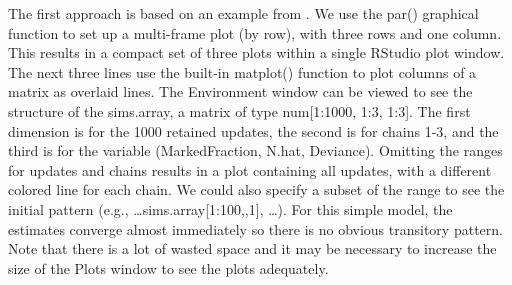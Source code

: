\documentclass[
]{krantz}
\makeatletter
\newenvironment{Shaded}{\begin{snugshade}}{\end{snugshade}}
\newcommand{\AttributeTok}[1]{\textcolor[rgb]{0.27,0.27,0.27}{#1}}
\newcommand{\CommentTok}[1]{\textcolor[rgb]{0.37,0.37,0.37}{\textit{#1}}}
\newcommand{\DecValTok}[1]{\textcolor[rgb]{0.06,0.06,0.06}{#1}}
\newcommand{\FunctionTok}[1]{\textcolor[rgb]{0.27,0.27,0.27}{\textbf{#1}}}
\newcommand{\NormalTok}[1]{#1}
\newcommand{\OtherTok}[1]{\textcolor[rgb]{0.37,0.37,0.37}{#1}}
\newcommand{\SpecialCharTok}[1]{\textcolor[rgb]{0.43,0.43,0.43}{\textbf{#1}}}
\newcommand{\StringTok}[1]{\textcolor[rgb]{0.5,0.5,0.5}{#1}}
\newenvironment{kframe}{%
\medskip{}
\setlength{\fboxsep}{.8em}
 \def\at@end@of@kframe{}%
 \ifinner\ifhmode%
  \def\at@end@of@kframe{\end{minipage}}%
  \begin{minipage}{\columnwidth}%
 \fi\fi%
 \def\FrameCommand##1{\hskip\@totalleftmargin \hskip-\fboxsep
 \colorbox{shadecolor}{##1}\hskip-\fboxsep
     \hskip-\linewidth \hskip-\@totalleftmargin \hskip\columnwidth}%
 \MakeFramed {\advance\hsize-\width
   \@totalleftmargin\z@ \linewidth\hsize
   \@setminipage}}%
 {\par\unskip\endMakeFramed%
 \at@end@of@kframe}
\renewenvironment{Shaded}{\begin{kframe}}{\end{kframe}}
\makeatother
\begin{document}
\begin{Shaded}
\end{Shaded}

The first approach is based on an example from \citet{kéry_2010}. We use the par() graphical function to set up a multi-frame plot (by row), with three rows and one column. This results in a compact set of three plots within a single RStudio plot window. The next three lines use the built-in matplot() function to plot columns of a matrix as overlaid lines. The Environment window can be viewed to see the structure of the sims.array, a matrix of type num{[}1:1000, 1:3, 1:3{]}. The first dimension is for the 1000 retained updates, the second is for chains 1-3, and the third is for the variable (MarkedFraction, N.hat, Deviance). Omitting the ranges for updates and chains results in a plot containing all updates, with a different colored line for each chain. We could also specify a subset of the range to see the initial pattern (e.g., \ldots sims.array{[}1:100,,1{]}, \ldots). For this simple model, the estimates converge almost immediately so there is no obvious transitory pattern. Note that there is a lot of wasted space and it may be necessary to increase the size of the Plots window to see the plots adequately.
\end{document}
